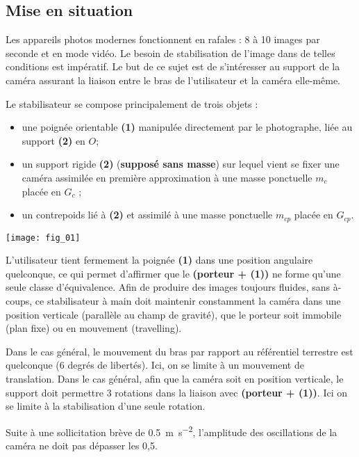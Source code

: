 \setcounter{exo}{0}




\ifprof
\else
\begin{multicols}{2}
\fi

\subsection*{Mise en situation}
 \ifprof
 \else

Les appareils photos modernes fonctionnent en rafales : 8 à 10 images par seconde et en mode vidéo. Le besoin de
stabilisation de l’image dans de telles conditions est impératif. Le but de ce sujet est de s’intéresser au support de la caméra assurant la liaison entre le bras de l'utilisateur et la caméra elle-même.

Le stabilisateur se compose principalement de trois objets :
\begin{itemize}
\item une poignée orientable \textbf{(1)} manipulée directement par le photographe, liée au support \textbf{(2)} en $O$;
\item un support rigide \textbf{(2)} (\textbf{supposé sans masse}) sur lequel vient se fixer une caméra assimilée en première approximation à une masse ponctuelle $m_c$ placée en $G_c$ ;
\item un contrepoids lié à \textbf{(2)} et assimilé à une masse ponctuelle $m_{cp}$ placée en $G_{cp}$.
\end{itemize}

\begin{center}
\texttt{[image: fig\_01]}
\end{center}

L’utilisateur tient fermement la poignée \textbf{(1)} dans une position angulaire quelconque, ce qui permet d’affirmer que le \textbf{(porteur + (1))} ne forme qu’une seule classe d’équivalence.
Afin de produire des images toujours fluides, sans à-coups, ce
stabilisateur à main doit maintenir constamment la caméra dans
une position verticale (parallèle au champ de
gravité), que le porteur soit immobile (plan fixe) ou en
mouvement (travelling).

Dans le cas général, le mouvement du bras par rapport au référentiel terrestre est quelconque (6 degrés de libertés). Ici, on se limite à un mouvement de translation. Dans le cas général, afin que la caméra soit en position verticale, le support doit permettre 3 rotations dans la liaison avec \textbf{(porteur + (1))}. Ici on se limite à la stabilisation d'une seule rotation. 
 \fi
\begin{obj}
Suite à une sollicitation brève de \SI{0,5}{m.s^{-2}}, l'amplitude des oscillations de la caméra ne doit pas dépasser les 0,5\degres.
\end{obj}


\end{multicols}
